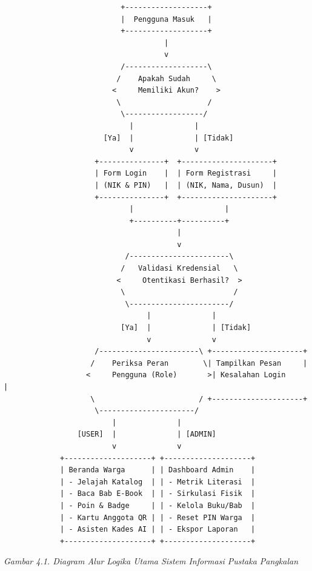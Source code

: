\documentclass[
  indonesian,
  12pt,
]{report}
\begin{document}
\begin{verbatim}
                           +-------------------+
                           |  Pengguna Masuk   |
                           +-------------------+
                                     |
                                     v
                           /-------------------\
                          /    Apakah Sudah     \
                         <     Memiliki Akun?    >
                          \                    /
                           \------------------/
                             |              |
                       [Ya]  |              | [Tidak]
                             v              v
                     +---------------+  +---------------------+
                     | Form Login    |  | Form Registrasi     |
                     | (NIK & PIN)   |  | (NIK, Nama, Dusun)  |
                     +---------------+  +---------------------+
                             |                     |
                             +----------+----------+
                                        |
                                        v
                            /-----------------------\
                           /   Validasi Kredensial   \
                          <     Otentikasi Berhasil?  >
                           \                         /
                            \-----------------------/
                                 |              |
                           [Ya]  |              | [Tidak]
                                 v              v
                     /-----------------------\ +---------------------+
                    /    Periksa Peran        \| Tampilkan Pesan     |
                   <     Pengguna (Role)       >| Kesalahan Login     |
                    \                        / +---------------------+
                     \----------------------/
                         |              |
                 [USER]  |              | [ADMIN]
                         v              v
             +--------------------+ +--------------------+
             | Beranda Warga      | | Dashboard Admin    |
             | - Jelajah Katalog  | | - Metrik Literasi  |
             | - Baca Bab E-Book  | | - Sirkulasi Fisik  |
             | - Poin & Badge     | | - Kelola Buku/Bab  |
             | - Kartu Anggota QR | | - Reset PIN Warga  |
             | - Asisten Kades AI | | - Ekspor Laporan   |
             +--------------------+ +--------------------+
\end{verbatim}

\emph{Gambar 4.1. Diagram Alur Logika Utama Sistem Informasi Pustaka
Pangkalan}
\end{document}
